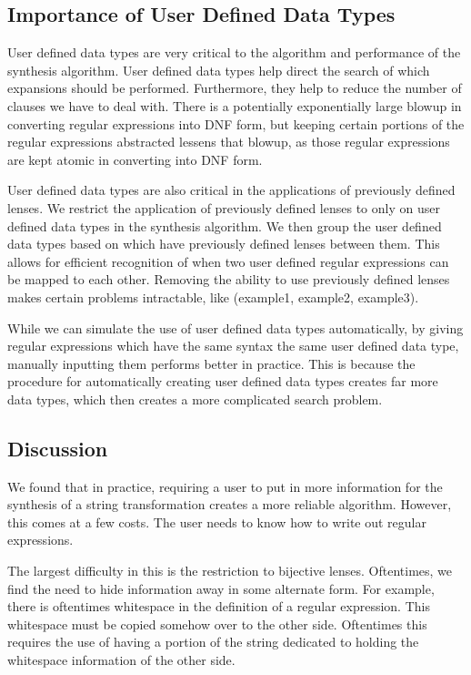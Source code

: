 \documentclass[numbers]{sigplanconf}
\begin{document}
\subsection{Importance of User Defined Data Types}

User defined data types are very critical to the algorithm and performance of
the synthesis algorithm.  User defined data types help direct the search of
which expansions should be performed.  Furthermore, they help to reduce the
number of clauses we have to deal with.  There is a potentially exponentially
large blowup in converting regular expressions into DNF form, but keeping
certain portions of the regular expressions abstracted lessens that blowup,
as those regular expressions are kept atomic in converting into DNF form.

User defined data types are also critical in the applications of previously
defined lenses.  We restrict the application of previously defined lenses to
only on user defined data types in the synthesis algorithm.  We then group the
user defined data types based on which have previously defined lenses between
them.  This allows for efficient recognition of when two user defined regular
expressions can be mapped to each other.  Removing the ability to use previously
defined lenses makes certain problems intractable, like (example1, example2,
example3).

While we can simulate the use of user defined data types automatically, by
giving regular expressions which have the same syntax the same user defined data
type, manually inputting them performs better in practice.  This is because the
procedure for automatically creating user defined data types creates far more
data types, which then creates a more complicated search problem.

\subsection{Discussion}

We found that in practice, requiring a user to put in more information for the
synthesis of a string transformation creates a more reliable algorithm.
However, this comes at a few costs.  The user needs to know how to write out
regular expressions.

The largest difficulty in this is the restriction to bijective lenses.
Oftentimes, we find the need to hide information away in some alternate form.
For example, there is oftentimes whitespace in the definition of a regular
expression.  This whitespace must be copied somehow over to the other side.
Oftentimes this requires the use of having a portion of the string dedicated to
holding the whitespace information of the other side.
\end{document}
